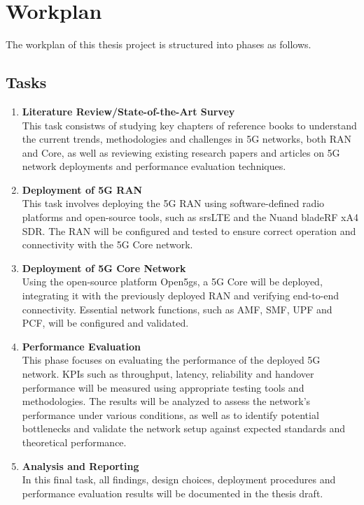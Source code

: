 
%

\chapter{Workplan}
\label{cha:workplan}
The workplan of this thesis project is structured into phases as follows.
\section{Tasks}
\label{sec:tasks}
\begin{enumerate}
    \item \textbf{Literature Review/State-of-the-Art Survey} ~\\
    This task consistws of studying key chapters of reference books to understand the current trends, methodologies and challenges in 5G networks, both RAN and Core, as well as reviewing existing research papers and articles on 5G network deployments and performance evaluation techniques.
    \item \textbf{Deployment of 5G RAN}~\\
    This task involves deploying the 5G \gls{RAN} using software-defined radio platforms and open-source tools, such as srsLTE and the Nuand bladeRF xA4 \gls{SDR}. The \gls{RAN} will be configured and tested to ensure correct operation and connectivity with the 5G Core network.
    \item \textbf{Deployment of 5G Core Network}~\\
    Using the open-source platform Open5gs, a 5G Core will be deployed, integrating it with the previously deployed \gls{RAN} and verifying end-to-end connectivity. Essential network functions, such as \gls{AMF}, \gls{SMF}, \gls{UPF} and \gls{PCF}, will be configured and validated.
    \item \textbf{Performance Evaluation}~\\
    This phase focuses on evaluating the performance of the deployed 5G network. \glspl{KPI} such as throughput, latency, reliability and handover performance will be measured using appropriate testing tools and methodologies. The results will be analyzed to assess the network's performance under various conditions, as well as to identify potential bottlenecks and validate the network setup against expected standards and theoretical performance.
    \item \textbf{Analysis and Reporting}~\\
    In this final task, all findings, design choices, deployment procedures and performance evaluation results will be documented in the  thesis draft. 
\end{enumerate}

